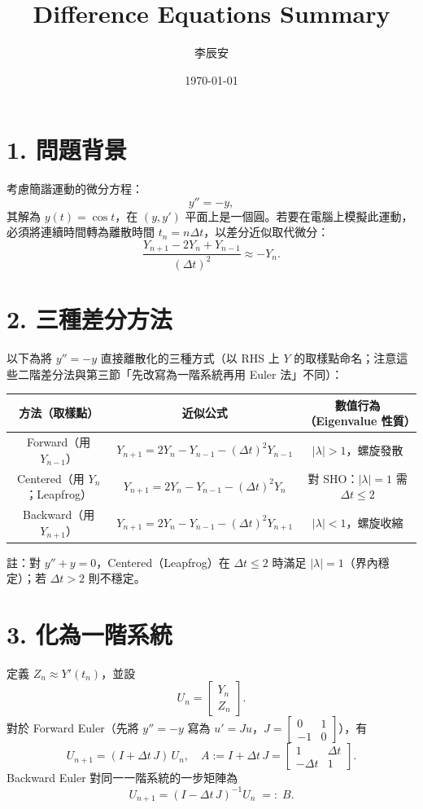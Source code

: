 \documentclass[a4paper,12pt]{article}
\title{Difference Equations Summary}
\author{李辰安}
\date{\today}
\begin{document}
\maketitle
\section*{1. 問題背景}
考慮簡諧運動的微分方程：
\[
y'' = -y,
\]
其解為 $y(t) = \cos t$，在 $(y, y')$ 平面上是一個圓。若要在電腦上模擬此運動，必須將連續時間轉為離散時間 $t_n = n\Delta t$，以差分近似取代微分：
\[
\frac{Y_{n+1} - 2Y_n + Y_{n-1}}{(\Delta t)^2} \approx -Y_n.
\]


\section*{2. 三種差分方法}
以下為將 $y'' = -y$ 直接離散化的三種方式（以 RHS 上 $Y$ 的取樣點命名；注意這些二階差分法與第三節「先改寫為一階系統再用 Euler 法」不同）：
\begin{center}
\begin{tabular}{|c|c|c|}
\hline
方法（取樣點） & 近似公式 & 數值行為（Eigenvalue 性質） \\
\hline
Forward（用 $Y_{n-1}$） & $Y_{n+1} = 2Y_n - Y_{n-1} - (\Delta t)^2 Y_{n-1}$ & $|\lambda| > 1$，螺旋發散 \\
Centered（用 $Y_{n}$；Leapfrog） & $Y_{n+1} = 2Y_n - Y_{n-1} - (\Delta t)^2 Y_n$ & 對 SHO：$|\lambda| = 1$ 需 $\Delta t \le 2$ \\
Backward（用 $Y_{n+1}$） & $Y_{n+1} = 2Y_n - Y_{n-1} - (\Delta t)^2 Y_{n+1}$ & $|\lambda| < 1$，螺旋收縮 \\
\hline
\end{tabular}
\end{center}
註：對 $y'' + y = 0$，Centered（Leapfrog）在 $\Delta t \le 2$ 時滿足 $|\lambda|=1$（界內穩定）；若 $\Delta t>2$ 則不穩定。


\section*{3. 化為一階系統}
定義 $Z_n \approx Y'(t_n)$，並設
\[
U_n = \begin{bmatrix} Y_n \\ Z_n \end{bmatrix}.
\]
對於 Forward Euler（先將 $y''=-y$ 寫為 $u' = Ju$，$J=\begin{bmatrix}0&1\\-1&0\end{bmatrix}$），有
\[
U_{n+1} = (I + \Delta t\, J)\, U_n, \quad
A := I + \Delta t\, J = \begin{bmatrix} 1 & \Delta t \\ -\Delta t & 1 \end{bmatrix}.
\]
Backward Euler 對同一一階系統的一步矩陣為
\[
U_{n+1} = (I - \Delta t\, J)^{-1} U_n \;=:\; B.
\]
\end{document}
